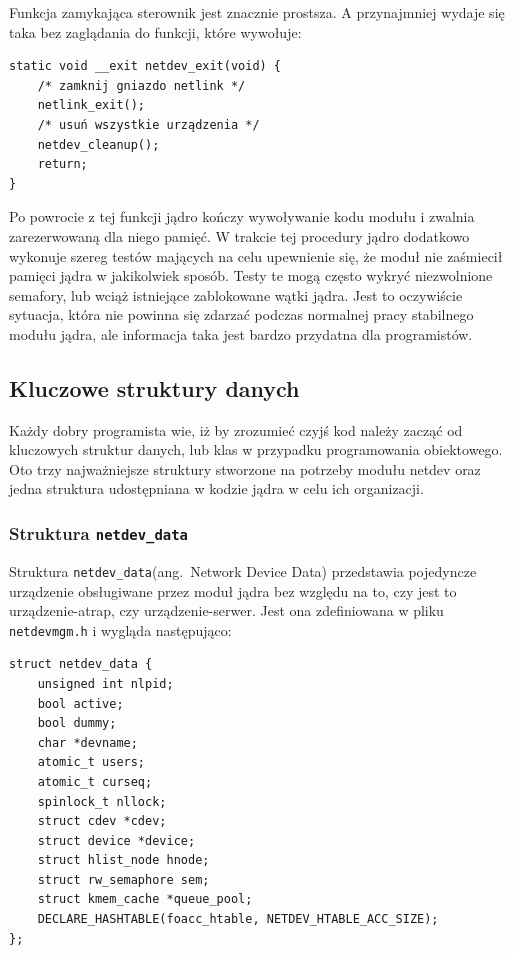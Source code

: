 \documentclass[11pt]{scrartcl}
\begin{document}
Funkcja zamykająca sterownik jest znacznie prostsza. A przynajmniej wydaje się taka bez zaglądania do funkcji, które wywołuje:

\begin{verbatim}
static void __exit netdev_exit(void) {
    /* zamknij gniazdo netlink */
    netlink_exit();
    /* usuń wszystkie urządzenia */
    netdev_cleanup();
    return;
}
\end{verbatim}

Po powrocie z tej funkcji jądro kończy wywoływanie kodu modułu i zwalnia zarezerwowaną dla niego pamięć. W trakcie tej procedury jądro dodatkowo wykonuje szereg testów mających na celu upewnienie się, że moduł nie zaśmiecił pamięci jądra w jakikolwiek sposób. Testy te mogą często wykryć niezwolnione semafory, lub wciąż istniejące zablokowane wątki jądra. Jest to oczywiście sytuacja, która nie powinna się zdarzać podczas normalnej pracy stabilnego modułu jądra, ale informacja taka jest bardzo przydatna dla programistów.

\subsection{Kluczowe struktury danych}
\label{mainstructs}

Każdy dobry programista wie, iż by zrozumieć czyjś kod należy zacząć od kluczowych struktur danych, lub klas w przypadku programowania obiektowego. Oto trzy najważniejsze struktury stworzone na potrzeby modułu netdev oraz jedna struktura udostępniana w kodzie jądra w celu ich organizacji.

\subsubsection{Struktura \texttt{\large{netdev\_data}}}

Struktura \texttt{netdev\_data}(ang.\ Network Device Data) przedstawia pojedyncze urządzenie obsługiwane przez moduł jądra bez względu na to, czy jest to urządzenie-atrap, czy urządzenie-serwer.  Jest ona zdefiniowana w pliku \texttt{netdevmgm.h} i wygląda następująco:

\begin{verbatim}
struct netdev_data {
    unsigned int nlpid;
    bool active;
    bool dummy;
    char *devname;
    atomic_t users;
    atomic_t curseq;
    spinlock_t nllock;
    struct cdev *cdev;
    struct device *device;
    struct hlist_node hnode;
    struct rw_semaphore sem;
    struct kmem_cache *queue_pool;
    DECLARE_HASHTABLE(foacc_htable, NETDEV_HTABLE_ACC_SIZE);
};
\end{verbatim}
\end{document}
